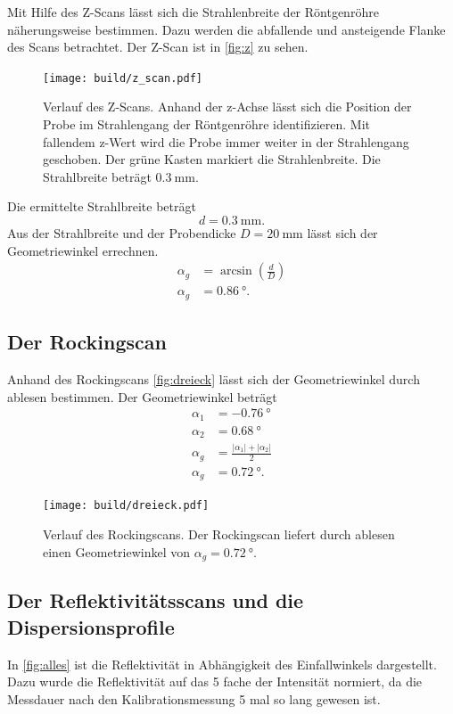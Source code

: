 Mit Hilfe des Z-Scans lässt sich die Strahlenbreite der Röntgenröhre näherungsweise bestimmen.
Dazu werden die abfallende und ansteigende Flanke des Scans betrachtet. 
Der Z-Scan ist in \autoref{fig:z} zu sehen.
\begin{figure}
    \centering
    \texttt{[image: build/z\_scan.pdf]}
    \caption{Verlauf des Z-Scans. Anhand der z-Achse lässt sich die Position der Probe im Strahlengang der Röntgenröhre identifizieren. 
            Mit fallendem z-Wert wird die Probe immer weiter in der Strahlengang geschoben. Der grüne Kasten markiert die Strahlenbreite. 
            Die Strahlbreite beträgt $\SI{0,3}{\milli\meter}$. }
    \label{fig:z}
\end{figure}
\FloatBarrier
Die ermittelte Strahlbreite beträgt
\begin{equation*}
    d =\SI{0,3}{\milli\meter}. 
\end{equation*}
Aus der Strahlbreite und der Probendicke $D = \SI{20}{\milli\meter}$ lässt sich der Geometriewinkel errechnen.
\begin{align*}
    \alpha_g &= \arcsin(\frac{d}{D})\\
    \alpha_g &= \SI{0.86}{\degree}.
\end{align*}

\subsection{Der Rockingscan}

Anhand des Rockingscans \autoref{fig:dreieck} lässt sich der Geometriewinkel durch ablesen bestimmen.
Der Geometriewinkel beträgt
\begin{align*}
    \alpha_1 &= \SI{-0.76}{\degree}\\    
    \alpha_2 &= \SI{0.68}{\degree}\\    
    \alpha_g &= \frac{|\alpha_1|+|\alpha_2|}{2}\\
    \alpha_g &= \SI{0.72}{\degree}.    
\end{align*}
\begin{figure}
    \centering
    \texttt{[image: build/dreieck.pdf]}
    \caption{Verlauf des Rockingscans. Der Rockingscan liefert durch ablesen einen Geometriewinkel von $\alpha_g = \SI{0.72}{\degree}$.}
    \label{fig:dreieck}
\end{figure}

\subsection{Der Reflektivitätsscans und die Dispersionsprofile}
In \autoref{fig:alles} ist die Reflektivität in Abhängigkeit des Einfallwinkels dargestellt.
Dazu wurde die Reflektivität auf das 5 fache der Intensität normiert, da die Messdauer nach den Kalibrationsmessung 5 mal so lang gewesen ist. 

